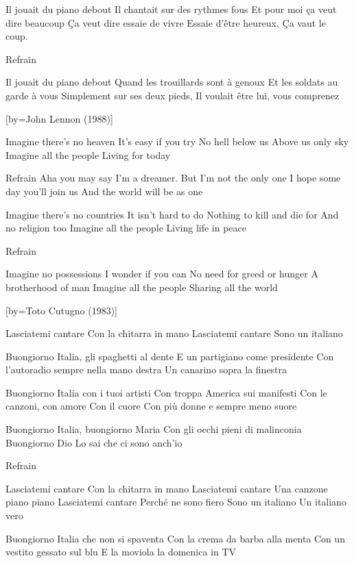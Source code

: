 \beginverse
Il jouait du piano debout
Il chantait sur des rythmes fous
Et pour moi ça veut dire beaucoup
Ça veut dire essaie de vivre
Essaie d'être heureux,
Ça vaut le coup.
\endverse

\beginverse
Refrain
\endverse

\beginverse
Il jouait du piano debout
Quand les trouillards sont à genoux
Et les soldats au garde à vous
Simplement sur ses deux pieds,
Il voulait être lui, vous comprenez
\endverse

[by={John Lennon (1988)}]

\beginverse
Imagine there's no heaven
It's easy if you try
No hell below us
Above us only sky
Imagine all the people
Living for today
\endverse

\beginverse
Refrain
Aha you may say I'm a dreamer.
But I'm not the only one
I hope some day you'll join us
And the world will be as one
\endverse

\beginverse
Imagine there's no countries
It isn't hard to do
Nothing to kill and die for
And no religion too
Imagine all the people
Living life in peace
\endverse

\beginverse
Refrain
\endverse

\beginverse
Imagine no possessions
I wonder if you can
No need for greed or hunger
A brotherhood of man
Imagine all the people
Sharing all the world
\endverse

[by={Toto Cutugno (1983)}]

\beginverse
Lasciatemi cantare
Con la chitarra in mano
Lasciatemi cantare
Sono un italiano
\endverse

\beginverse
Buongiorno Italia, gli spaghetti al dente
E un partigiano come presidente
Con l'autoradio sempre nella mano destra
Un canarino sopra la finestra
\endverse

\beginverse
Buongiorno Italia con i tuoi artisti
Con troppa America sui manifesti
Con le canzoni, con amore
Con il cuore
Con più donne e sempre meno suore
\endverse

\beginverse
Buongiorno Italia, buongiorno Maria
Con gli occhi pieni di malinconia
Buongiorno Dio
Lo sai che ci sono anch'io
\endverse

\beginverse
Refrain
\endverse

\beginverse
Lasciatemi cantare
Con la chitarra in mano
Lasciatemi cantare
Una canzone piano piano
Lasciatemi cantare
Perché ne sono fiero
Sono un italiano
Un italiano vero
\endverse

\beginverse
Buongiorno Italia che non si spaventa
Con la crema da barba alla menta
Con un vestito gessato sul blu
E la moviola la domenica in TV
\endverse

